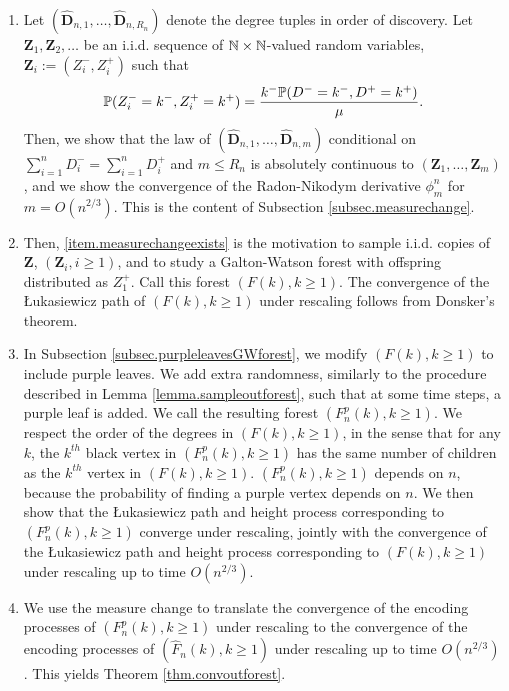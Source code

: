 \begin{enumerate}
    \item \label{item.measurechangeexists} Let $(\mathbf{\hat{D}}_{n,1},\dots,\mathbf{\hat{D}}_{n,R_n})$ denote the degree tuples in order of discovery. Let $\mathbf{Z}_1, \mathbf{Z}_2, \ldots$ be an i.i.d. sequence of $\N\times \N$-valued random variables, $\mathbf{Z}_i:=(Z_i^-,Z_i^+)$ such that 
    $$\P(Z_i^-=k^-, Z_i^+=k^+)=\frac{k^-\P(D^-=k^-,D^+=k^+)}{\mu}.$$
    Then, we show that the law of $(\mathbf{\hat{D}}_{n,1},\dots,\mathbf{\hat{D}}_{n,m})$ conditional on $\sum_{i=1}^n D_i^-=\sum_{i=1}^n D_i^+$ and $m \leq R_n$ is absolutely continuous to $(\mathbf{Z}_1,\dots, \mathbf{Z}_m)$, and we show the convergence of the Radon-Nikodym derivative $\phi_m^n$ for $m=O(n^{2/3})$. This is the content of Subsection \ref{subsec.measurechange}.
    \item Then, \ref{item.measurechangeexists} is the motivation to sample i.i.d. copies of $\mathbf{Z}$, $(\mathbf{Z}_i,i\geq 1)$, and to study a Galton-Watson forest with offspring distributed as $Z_1^+$. Call this forest $(F(k),k\geq 1)$. The convergence of the \L ukasiewicz path of $(F(k),k\geq 1)$ under rescaling follows from Donsker's theorem.
    \item In Subsection \ref{subsec.purpleleavesGWforest}, we modify $(F(k),k\geq 1)$ to include purple leaves. We add extra randomness, similarly to the procedure described in Lemma \ref{lemma.sampleoutforest}, such that at some time steps, a purple leaf is added. We call the resulting forest $(F^p_n(k),k\geq 1)$. We respect the order of the degrees in $(F(k),k\geq 1)$, in the sense that for any $k$, the $k^{th}$ black vertex in $(F^p_n(k),k\geq 1)$ has the same number of children as the $k^{th}$ vertex in $(F(k),k\geq 1)$. $(F^p_n(k),k\geq 1)$ depends on $n$, because the probability of finding a purple vertex depends on $n$. We then show that the \L ukasiewicz path and height process corresponding to $(F^p_n(k),k\geq 1)$ converge under rescaling, jointly with the convergence of the \L ukasiewicz path and height process corresponding to $(F(k),k\geq 1)$ under rescaling up to time $O(n^{2/3})$.
    \item We use the measure change to translate the convergence of the encoding processes of $(F^p_n(k),k\geq 1)$ under rescaling to the convergence of the encoding processes of $(\hat{F}_n(k),k\geq 1)$ under rescaling up to time $O(n^{2/3})$. This yields Theorem \ref{thm.convoutforest}. 
\end{enumerate}


